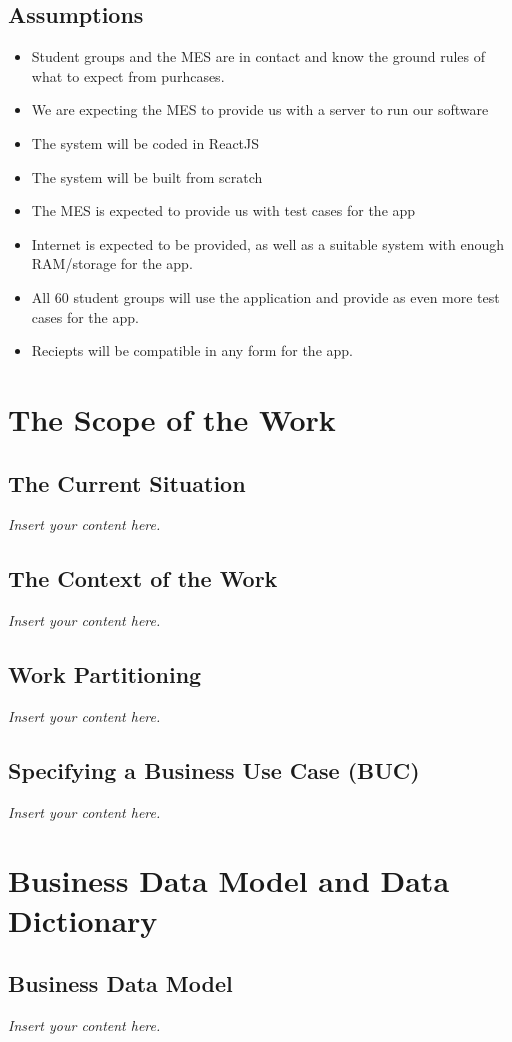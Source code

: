 \documentclass[12pt]{article}
\newcommand{\lips}{\textit{Insert your content here.}}
\begin{document}
\subsection{Assumptions}
\begin{itemize}
  \item Student groups and the MES are in contact and know the ground rules of what to expect from purhcases.
  \item We are expecting the MES to provide us with a server to run our software
  \item The system will be coded in ReactJS
  \item The system will be built from scratch 
  \item The MES is expected to provide us with test cases for the app
  \item Internet is expected to be provided, as well as a suitable system with enough RAM/storage for the app. 
  \item All 60 student groups will use the application and provide as even more test cases for the app. 
  \item Reciepts will be compatible in any form for the app.
\end{itemize}

\section{The Scope of the Work}
\subsection{The Current Situation}
\lips
\subsection{The Context of the Work}
\lips
\subsection{Work Partitioning}
\lips
\subsection{Specifying a Business Use Case (BUC)}
\lips

\section{Business Data Model and Data Dictionary}
\subsection{Business Data Model}
\lips
\end{document}
